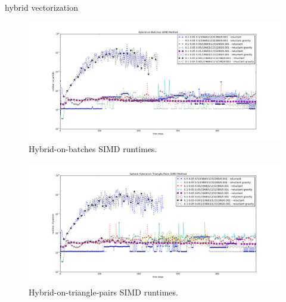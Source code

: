 hybrid vectorization

\begin{figure}[htb]
  \begin{center}
    \includegraphics[width=1\textwidth]{experiments/vectorisation/plots/log_sphere-hybrid-on-batchesSIMD.png}
  \end{center}
  \caption{Hybrid-on-batches SIMD runtimes.}
  \label{figure:triangle_omp}
\end{figure}


\begin{figure}[htb]
  \begin{center}
    \includegraphics[width=1\textwidth]{experiments/vectorisation/plots/log_sphere-hybrid-triangle-pairs-SIMD.png}
  \end{center}
  \caption{Hybrid-on-triangle-pairs SIMD runtimes.}
  \label{figure:triangle_omp}
\end{figure}


